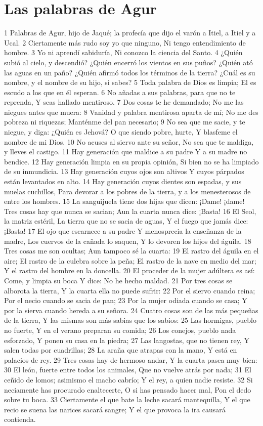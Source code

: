 \section*{Las palabras de Agur}

1 Palabras de Agur, hijo de Jaqué; la profecía que dijo el varón a Itiel, a Itiel y a Ucal.
2 Ciertamente más rudo soy yo que ninguno,
Ni tengo entendimiento de hombre.
3 Yo ni aprendí sabiduría, 
Ni conozco la ciencia del Santo.
4 ¿Quién subió al cielo, y descendió?
¿Quién encerró los vientos en sus puños?
¿Quién ató las aguas en un paño?
¿Quién afirmó todos los términos de la tierra?
¿Cuál es su nombre, y el nombre de su hijo, si sabes?
5 Toda palabra de Dios es limpia;
El es escudo a los que en él esperan.
6 No añadas a sus palabras, para que no te reprenda,
Y seas hallado mentiroso.
7 Dos cosas te he demandado;
No me las niegues antes que muera:
8 Vanidad y palabra mentirosa aparta de mí;
No me des pobreza ni riquezas;
Manténme del pan necesario;
9 No sea que me sacie, y te niegue, y diga: ¿Quién es Jehová?
O que siendo pobre, hurte,
Y blasfeme el nombre de mi Dios.
10 No acuses al siervo ante su señor, 
No sea que te maldiga, y lleves el castigo.
11 Hay generación que maldice a su padre
Y a su madre no bendice.
12 Hay generación limpia en su propia opinión,
Si bien no se ha limpiado de su inmundicia.
13 Hay generación cuyos ojos son altivos
Y cuyos párpados están levantados en alto.
14 Hay generación cuyos dientes son espadas, y sus muelas cuchillos,
Para devorar a los pobres de la tierra, y a los menesterosos de entre los hombres.
15 La sanguijuela tiene dos hijas que dicen: ¡Dame! ¡dame!
Tres cosas hay que nunca se sacian;
Aun la cuarta nunca dice: ¡Basta!
16 El Seol, la matriz estéril,
La tierra que no se sacia de aguas,
Y el fuego que jamás dice: ¡Basta!
17 El ojo que escarnece a su padre
Y menosprecia la enseñanza de la madre,
Los cuervos de la cañada lo saquen,
Y lo devoren los hijos del águila.
18 Tres cosas me son ocultas;
Aun tampoco sé la cuarta:
19 El rastro del águila en el aire;
El rastro de la culebra sobre la peña;
El rastro de la nave en medio del mar;
Y el rastro del hombre en la doncella.
20 El proceder de la mujer adúltera es así:
Come, y limpia su boca
Y dice: No he hecho maldad.
21 Por tres cosas se alborota la tierra,
Y la cuarta ella no puede sufrir:
22 Por el siervo cuando reina;
Por el necio cuando se sacia de pan;
23 Por la mujer odiada cuando se casa;
Y por la sierva cuando hereda a su señora.
24 Cuatro cosas son de las más pequeñas de la tierra,
Y las mismas son más sabias que los sabios:
25 Las hormigas, pueblo no fuerte,
Y en el verano preparan su comida;
26 Los conejos, pueblo nada esforzado,
Y ponen su casa en la piedra;
27 Las langostas, que no tienen rey,
Y salen todas por cuadrillas; 
28 La araña que atrapas con la mano,
Y está en palacios de rey.
29 Tres cosas hay de hermoso andar,
Y la cuarta pasea muy bien: 
30 El león, fuerte entre todos los animales,
Que no vuelve atrás por nada;
31 El ceñido de lomos; asimismo el macho cabrío;
Y el rey, a quien nadie resiste.
32 Si neciamente has procurado enaltecerte,
O si has pensado hacer mal,
Pon el dedo sobre tu boca.
33 Ciertamente el que bate la leche sacará mantequilla,
Y el que recio se suena las narices sacará sangre;
Y el que provoca la ira causará contienda.

